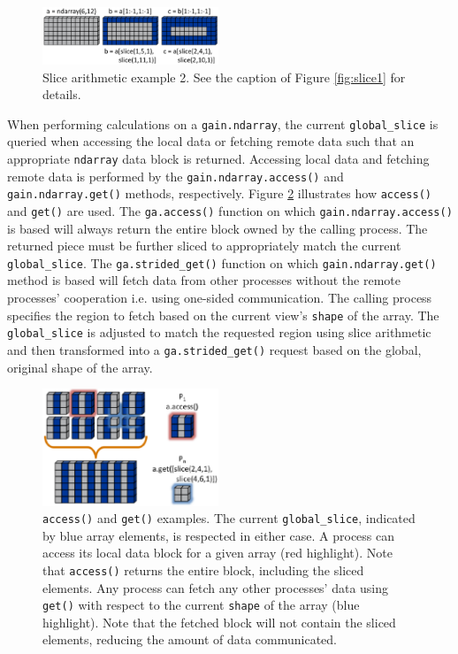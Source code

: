 \documentclass{sigplanconf}
\begin{document}
\begin{figure}[htb]
\centering
\includegraphics[width=0.47\textwidth]{image4b_crop.eps}
\caption{
Slice arithmetic example 2. See the caption of Figure \ref{fig:slice1} for
details.
}
\label{fig:figslice2}
\end{figure}

When performing calculations on a \verb=gain.ndarray=, the current
\verb=global_slice= is queried when accessing the local data or fetching
remote data such that an appropriate \verb=ndarray= data block is returned.
Accessing local data and fetching remote data is performed by the
\verb=gain.ndarray.access()= and \verb=gain.ndarray.get()= methods,
respectively.  Figure \ref{fig:accessget} illustrates how \verb=access()= and
\verb=get()= are used. The \verb=ga.access()= function on which\linebreak
\verb=gain.ndarray.access()= is based will always return the entire block
owned by the calling process. The returned piece must be further sliced to
appropriately match the current \verb=global_slice=. The
\verb=ga.strided_get()= function on which \verb=gain.ndarray.get()= method is
based will fetch data from other processes without the remote processes'
cooperation i.e. using one-sided communication.  The calling process specifies
the region to fetch based on the current view's \verb=shape= of the array. The
\verb=global_slice= is adjusted to match the requested region using slice
arithmetic and then transformed into a \verb=ga.strided_get()= request based
on the global, original shape of the array.

\begin{figure}[htb]
\centering
\includegraphics[width=0.47\textwidth]{image5_crop.eps}
\caption{
\texttt{access()} and \texttt{get()} examples. The current
\texttt{global\_slice}, indicated by blue array elements, is respected in
either case. A process can access its local data block for a given array (red
highlight). Note that \texttt{access()} returns the entire block, including
the sliced elements.  Any process can fetch any other processes' data using
\texttt{get()} with respect to the current \texttt{shape} of the array (blue
highlight).  Note that the fetched block will not contain the sliced elements,
reducing the amount of data communicated.
}
\label{fig:accessget}
\end{figure}
\end{document}
